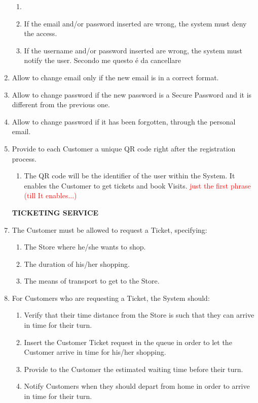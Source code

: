 \documentclass[a4paper, 10pt, oneside]{article}
\newcommand*{\lorenzo}[1]{\textcolor{BurntOrange}{#1}}
\newcommand{\yasmin}[1]{\textcolor{Red}{#1}}
\begin{document}
\begin{enumerate}[align=left]
\begin{enumerate}[label={-}]
        \item \item \label{req:login:invalidCred} If the email and/or password inserted are wrong, the system must deny the access.
        \item If the username and/or password inserted are wrong, the system must notify the user. \lorenzo{Secondo me questo é da cancellare}
    \end{enumerate}
    \item \label{req:changeMail} Allow to change email only if the new email is in a correct format.
    \item Allow to change password if the new password is a Secure Password and it is different from the previous one.
    \item \label{req:changePass}Allow to change password if it has been forgotten, through the personal email.
    \item \label{req:provideQR} Provide to each Customer a unique QR code \lorenzo{right after the registration process}.
    \begin{enumerate}[label={-}]
        \item \label{req:provideQR:uniqueID} \lorenzo{The QR code will be the identifier of the user within the System. It enables the Customer to get tickets and book Visits.} \yasmin{just the first phrase (till It enables...)}
    \end{enumerate}
    
    \item[\textbf{TICKETING SERVICE}]
    \item \label{req:requestTicket} The Customer must be allowed to request a Ticket, specifying:
     \begin{enumerate}[label={-}]
        \item \label{req:requestTicket:store} The Store where he/she wants to shop.
        \item \label{req:requestTicket:duration}The duration of his/her shopping.
        \item \label{req:requestTicket:transport}The means of transport to get to the Store.
    \end{enumerate}
    \item \label{req:systemTicket}For Customers who are requesting a Ticket, the System should:
    \begin{enumerate}[label={-}]
        \item \label{req:systemTicket:verifyDist} Verify that their time distance from the Store is such that they can arrive in time for their turn.
        \item \label{req:systemTicket:addInQueue}Insert the Customer Ticket request in the queue in order to let the Customer arrive in time for his/her shopping.
        \item \label{req:systemTicket:waitingTime} Provide to the Customer the estimated waiting time before their turn.
        \item \label{req:systemTicket:notifForDepart} Notify Customers when they should depart from home in order to arrive in time for their turn.
    \end{enumerate}
    

\end{enumerate}
\end{document}
